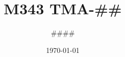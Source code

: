 \documentclass[a4paper]{article}
\title{M343 TMA-##}
\author{####}
\date{\today}
\begin{document}
\maketitle


\section{} %

\subsection{} %

\subsubsection{}



\subsubsection{}



\subsubsection{}

\subsection{}%





\section{}%

\subsection{}%


\subsection{}%

\subsubsection{}

\subsubsection{}
\end{document}
